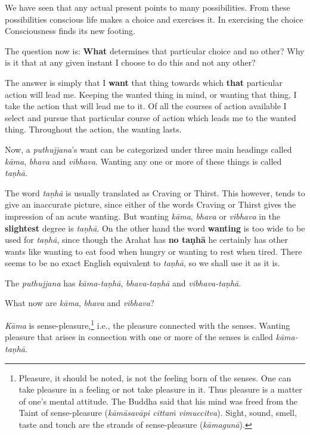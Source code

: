We have seen that any actual present points to many possibilities. From these possibilities conscious life makes a choice and exercises it. In exercising the choice Consciousness finds its new footing.

The question now is: \textbf{What} determines that particular choice and no other? Why is it that at any given instant I choose to do this and not any other?

The answer is simply that I \textbf{want} that thing towards which \textbf{that} particular action will lead me. Keeping the wanted thing in mind, or wanting that thing, I take the action that will lead me to it. Of all the courses of action available I select and pursue that particular course of action which leads me to the wanted thing. Throughout the action, the wanting lasts.

Now, a \emph{puthujjana}'s want can be categorized under three main headings called \emph{kāma}, \emph{bhava} and \emph{vibhava}. Wanting any one or more of these things is called \emph{taṇhā}.

The word \emph{taṇhā} is usually translated as Craving or Thirst. This however, tends to give an inaccurate picture, since either of the words Craving or Thirst gives the impression of an acute wanting. But wanting \emph{kāma}, \emph{bhava} or \emph{vibhava} in the \textbf{slightest} degree is \emph{taṇhā}. On the other hand the word \textbf{wanting} is too wide to be used for \emph{taṇhā}, since though the Arahat has \textbf{no taṇhā} he certainly has other wants like wanting to eat food when hungry or wanting to rest when tired. There seems to be no exact English equivalent to \emph{taṇhā}, so we shall use it as it is.

The \emph{puthujjana} has \emph{kāma-taṇhā}, \emph{bhava-taṇhā} and \emph{vibhava-taṇhā}.

What now are \emph{kāma}, \emph{bhava} and \emph{vibhava}?

\emph{Kāma} is sense-pleasure,\footnote{Pleasure, it should be noted, is not the feeling born of the senses. One can take pleasure in a feeling or not take pleasure in it. Thus pleasure is a matter of one's mental attitude. The Buddha said that his mind was freed from the Taint of sense-pleasure (\emph{kāmāsavāpi cittaṁ vimuccitva}). Sight, sound, smell, taste and touch are the strands of sense-pleasure (\emph{kāmagunā}).} i.e., the pleasure connected with the senses. Wanting pleasure that arises in connection with one or more of the senses is called \emph{kāma-taṇhā}.

